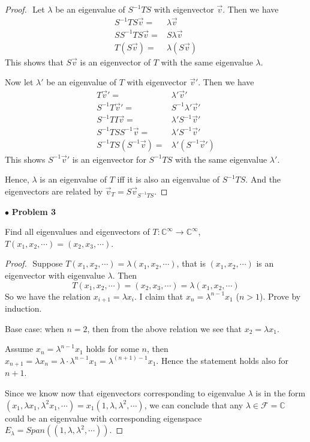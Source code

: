 \documentclass{article}
\begin{document}
\begin{proof}
$ $\newline
Let $\lambda$ be an eigenvalue of $S^{-1}TS$ with eigenvector $\vec{v}$. Then we have
\begin{align*}
S^{-1}TS \vec{v} =& \lambda \vec{v} \\
SS^{-1}TS \vec{v} =& S\lambda \vec{v} \\
T(S \vec{v})=& \lambda (S\vec{v})
\end{align*}
This shows that $S\vec{v}$ is an eigenvector of $T$ with the same eigenvalue $\lambda$.
\smallskip

Now let $\lambda'$ be an eigenvalue of $T$ with eigenvector $\vec{v}'$. Then we have
\begin{align*}
T\vec{v}' =& \lambda' \vec{v}' \\
S^{-1}T\vec{v}' =& S^{-1}\lambda' \vec{v}'\\
S^{-1}T I \vec{v} =& \lambda' S^{-1} \vec{v}' \\
S^{-1}T SS^{-1} \vec{v} =& \lambda' S^{-1} \vec{v}' \\
S^{-1}T S(S^{-1} \vec{v}) =& \lambda' (S^{-1} \vec{v}')
\end{align*}
This shows $S^{-1}\vec{v}'$ is an eigenvector for $S^{-1}TS$ with the same eigenvalue $\lambda'$. 

Hence, $\lambda$ is an eigenvalue of $T$ iff it is also an eigenvalue of $S^{-1}TS$. And the eigenvectors are related by $\vec{v}_{T} = S\vec{v}_{S^{-1}TS}$.
\end{proof}

\newpage
$ \bullet$ \textbf{Problem 3}
\medskip

\begin{itshape}
Find all eigenvalues and eigenvectors of $T: \mathbb{C}^\infty \to \mathbb{C}^\infty$, $T(x_1, x_2, \cdots) = (x_2, x_3, \cdots)$.
\end{itshape}
\medskip

\begin{proof}
$ $\newline
Suppose $T(x_1, x_2, \cdots) = \lambda (x_1, x_2, \cdots)$, that is $(x_1,x_2, \cdots)$ is an eigenvector with eigenvalue $\lambda$. Then
$$
T(x_1,x_2, \cdots) = (x_2, x_3, \cdots) = \lambda(x_1,x_2, \cdots)
$$
So we have the relation $x_{i+1} =\lambda x_i$. I claim that $x_n = \lambda^{n-1} x_1$ ($n >1$). Prove by induction.

Base case: when $n=2$, then from the above relation we see that $x_2 = \lambda x_1$.

Assume $x_n = \lambda ^{n-1}x_1$ holds for some $n$, then $x_{n+1} = \lambda x_n = \lambda \cdot \lambda ^{n-1}x_1 = \lambda^{(n+1)-1} x_1$. Hence the statement holds also for $n+1$. 
\smallskip

Since we know now that eigenvectors corresponding to eigenvalue $\lambda$ is in the form $(x_1, \lambda x_1, \lambda^2 x_1, \cdots) = x_1(1, \lambda, \lambda^2, \cdots)$, we can conclude that any $\lambda \in \mathcal{F} = \mathbb{C}$ could be an eigenvalue with corresponding eigenspace $E_\lambda = Span((1,\lambda, \lambda^2, \cdots))$.
\end{proof}
\end{document}
